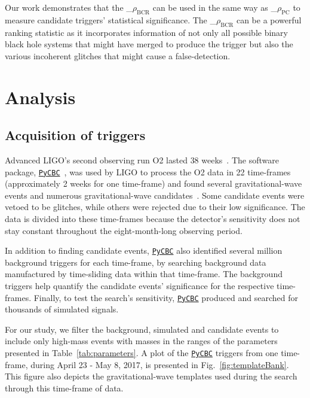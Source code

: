 \documentclass[%
 nofootinbib,
 amsmath,amssymb,
 aps,
 twocolumn
]{revtex4-2}
\newcommand{\pycbc}{{\sc \href{https://pycbc.org/}{\texttt{PyCBC}}}\xspace}
\newcommand{\mathcmd}[1]{{\sc \relax\ifmmode#1\else $#1$\fi}\xspace}
\newcommand{\bcr}{\mathcmd{\rho_\text{BCR}}}
\newcommand{\pycbcstat}{\mathcmd{\rho_\text{PC}}}
\begin{document}
Our work demonstrates that the \bcr can be used in the same way as \pycbcstat to measure candidate triggers' statistical significance.  The \bcr can be a powerful ranking statistic as it incorporates information of not only all possible binary black hole systems that might have merged to produce the trigger but also the various incoherent glitches that might cause a false-detection. 

\section{Analysis}\label{sec:Analysis}

\subsection{Acquisition of triggers}
Advanced LIGO's second observing run O2 lasted $38$ weeks~\cite{GWOSC}. The software package, \pycbc~\cite{pycbc_code}, was used by LIGO to process the O2 data in 22 time-frames (approximately 2 weeks for one time-frame) and found several gravitational-wave events and numerous gravitational-wave candidates~\cite{pycbc_og0, pycbc_og1, pycbc_og2, pycbc_og3, pycbc_og4, pycbc_og5, pycbc_og6}. Some candidate events were vetoed to be glitches, while others were rejected due to their low significance. The data is divided into these time-frames because the detector's sensitivity does not stay constant throughout the eight-month-long observing period.

In addition to finding candidate events, \pycbc also identified several million background triggers for each time-frame, by searching background data manufactured by time-sliding data within that time-frame. The background triggers help quantify the candidate events' significance for the respective time-frames. Finally, to test the search's sensitivity, \pycbc produced and searched for thousands of simulated signals. 

For our study, we filter the background, simulated and candidate events to include only high-mass events with masses in the ranges of the parameters presented in Table~\ref{tab:parameters}. A plot of the \pycbc triggers from one time-frame, during April 23 - May 8, 2017, is presented in Fig.~\ref{fig:templateBank}. This figure also depicts the gravitational-wave templates used during the search through this time-frame of data. 
\end{document}
